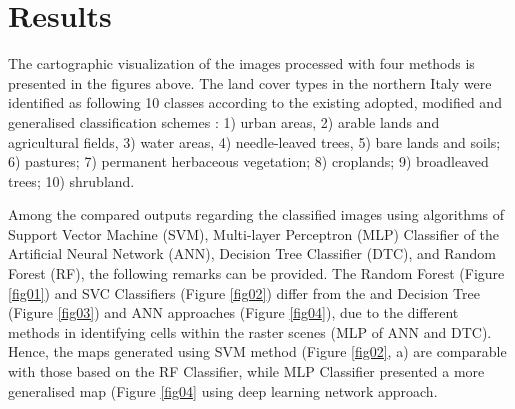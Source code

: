 \documentclass[eprint,
approc,		%
]{actapoly}
\begin{document}
\section{Results}

The cartographic visualization of the images processed with four methods is presented in the figures above. The land cover types in the northern Italy were identified as following 10 classes according to the existing adopted, modified and generalised classification schemes \citep{DeFioravante}: 1) urban areas, 2) arable lands and agricultural fields, 3) water areas, 4) needle-leaved trees, 5) bare lands and soils; 6) pastures; 7) permanent herbaceous vegetation; 8) croplands; 9) broadleaved trees; 10) shrubland. 

Among the compared outputs regarding the classified images using algorithms of Support Vector Machine (SVM), Multi-layer Perceptron (MLP) Classifier of the Artificial Neural Network (ANN), Decision Tree Classifier (DTC), and Random Forest (RF), the following remarks can be provided. The Random Forest (Figure \ref{fig01}) and SVC Classifiers (Figure \ref{fig02}) differ from the  and Decision Tree (Figure \ref{fig03}) and ANN approaches (Figure \ref{fig04}), due to the different methods in identifying cells within the raster scenes (MLP of ANN and DTC). Hence, the maps generated using SVM method (Figure \ref{fig02}, a) are comparable with those based on the RF Classifier, while MLP Classifier presented a more generalised map (Figure \ref{fig04} using deep learning network approach. 
\end{document}
